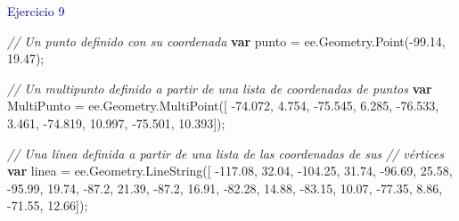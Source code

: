 \documentclass[
  12pt,
  letterpaper,
  twoside]{book}
\newenvironment{Shaded}{\begin{snugshade}}{\end{snugshade}}
\newcommand{\AttributeTok}[1]{\textcolor[rgb]{0.48,0.12,0.64}{#1}}
\newcommand{\CommentTok}[1]{\textcolor[rgb]{0.24,0.58,0.00}{\textit{#1}}}
\newcommand{\FloatTok}[1]{\textcolor[rgb]{0.28,0.53,0.93}{#1}}
\newcommand{\FunctionTok}[1]{\textcolor[rgb]{0.48,0.12,0.64}{#1}}
\newcommand{\KeywordTok}[1]{\textcolor[rgb]{0.00,0.00,0.00}{\textbf{#1}}}
\newcommand{\NormalTok}[1]{#1}
\newcommand{\OperatorTok}[1]{\textcolor[rgb]{0.00,0.00,0.00}{#1}}
\begin{document}
\textcolor{darkblue}{Ejercicio 9}

\begin{Shaded}
\begin{Highlighting}[]
\CommentTok{// Un punto definido con su coordenada  }
\KeywordTok{var}\NormalTok{ punto }\OperatorTok{=}\NormalTok{ ee}\OperatorTok{.}\AttributeTok{Geometry}\OperatorTok{.}\FunctionTok{Point}\NormalTok{(}\OperatorTok{{-}}\FloatTok{99.14}\OperatorTok{,} \FloatTok{19.47}\NormalTok{)}\OperatorTok{;} 

\CommentTok{// Un multipunto definido a partir de una lista de coordenadas de puntos}
\KeywordTok{var}\NormalTok{ MultiPunto }\OperatorTok{=}\NormalTok{ ee}\OperatorTok{.}\AttributeTok{Geometry}\OperatorTok{.}\FunctionTok{MultiPoint}\NormalTok{([     }
  \OperatorTok{{-}}\FloatTok{74.072}\OperatorTok{,} \FloatTok{4.754}\OperatorTok{,}                              
  \OperatorTok{{-}}\FloatTok{75.545}\OperatorTok{,} \FloatTok{6.285}\OperatorTok{,}                             
  \OperatorTok{{-}}\FloatTok{76.533}\OperatorTok{,} \FloatTok{3.461}\OperatorTok{,}
  \OperatorTok{{-}}\FloatTok{74.819}\OperatorTok{,} \FloatTok{10.997}\OperatorTok{,}
  \OperatorTok{{-}}\FloatTok{75.501}\OperatorTok{,} \FloatTok{10.393}\NormalTok{])}\OperatorTok{;}

\CommentTok{// Una línea definida a partir de una lista de las coordenadas de sus }
\CommentTok{// vértices}
\KeywordTok{var}\NormalTok{ linea }\OperatorTok{=}\NormalTok{ ee}\OperatorTok{.}\AttributeTok{Geometry}\OperatorTok{.}\FunctionTok{LineString}\NormalTok{([ }
  \OperatorTok{{-}}\FloatTok{117.08}\OperatorTok{,} \FloatTok{32.04}\OperatorTok{,}                    
  \OperatorTok{{-}}\FloatTok{104.25}\OperatorTok{,} \FloatTok{31.74}\OperatorTok{,}                    
  \OperatorTok{{-}}\FloatTok{96.69}\OperatorTok{,} \FloatTok{25.58}\OperatorTok{,}
  \OperatorTok{{-}}\FloatTok{95.99}\OperatorTok{,} \FloatTok{19.74}\OperatorTok{,}
  \OperatorTok{{-}}\FloatTok{87.2}\OperatorTok{,} \FloatTok{21.39}\OperatorTok{,}
  \OperatorTok{{-}}\FloatTok{87.2}\OperatorTok{,} \FloatTok{16.91}\OperatorTok{,}
  \OperatorTok{{-}}\FloatTok{82.28}\OperatorTok{,} \FloatTok{14.88}\OperatorTok{,}
  \OperatorTok{{-}}\FloatTok{83.15}\OperatorTok{,} \FloatTok{10.07}\OperatorTok{,}
  \OperatorTok{{-}}\FloatTok{77.35}\OperatorTok{,} \FloatTok{8.86}\OperatorTok{,}
  \OperatorTok{{-}}\FloatTok{71.55}\OperatorTok{,} \FloatTok{12.66}\NormalTok{])}\OperatorTok{;} 


\end{Highlighting}
\end{Shaded}
\end{document}
